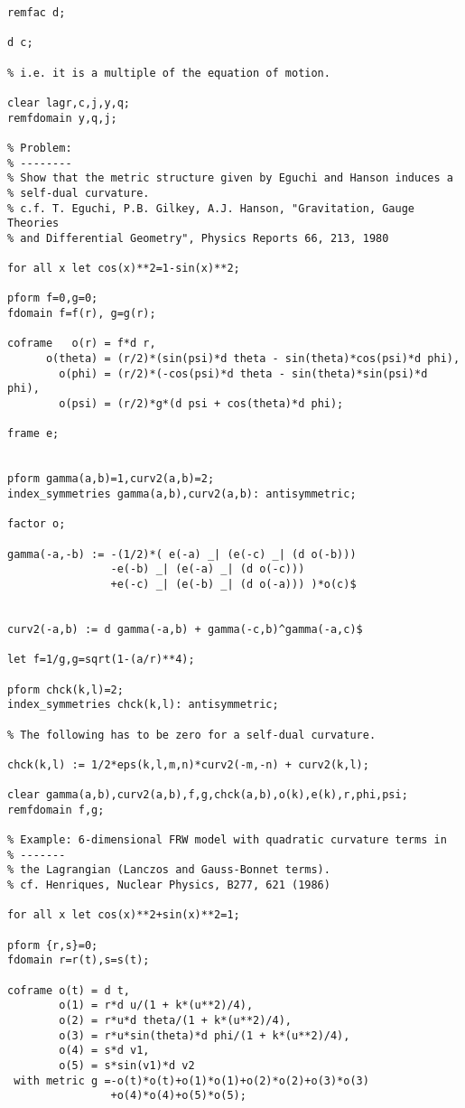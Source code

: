 {\begin{verbatim}
remfac d;

d c;

% i.e. it is a multiple of the equation of motion.

clear lagr,c,j,y,q;
remfdomain y,q,j;

% Problem:
% --------
% Show that the metric structure given by Eguchi and Hanson induces a
% self-dual curvature.
% c.f. T. Eguchi, P.B. Gilkey, A.J. Hanson, "Gravitation, Gauge Theories
% and Differential Geometry", Physics Reports 66, 213, 1980

for all x let cos(x)**2=1-sin(x)**2;

pform f=0,g=0;
fdomain f=f(r), g=g(r);

coframe   o(r) = f*d r,
      o(theta) = (r/2)*(sin(psi)*d theta - sin(theta)*cos(psi)*d phi),
        o(phi) = (r/2)*(-cos(psi)*d theta - sin(theta)*sin(psi)*d phi),
        o(psi) = (r/2)*g*(d psi + cos(theta)*d phi);

frame e;


pform gamma(a,b)=1,curv2(a,b)=2;
index_symmetries gamma(a,b),curv2(a,b): antisymmetric;

factor o;

gamma(-a,-b) := -(1/2)*( e(-a) _| (e(-c) _| (d o(-b)))
		        -e(-b) _| (e(-a) _| (d o(-c)))
		        +e(-c) _| (e(-b) _| (d o(-a))) )*o(c)$


curv2(-a,b) := d gamma(-a,b) + gamma(-c,b)^gamma(-a,c)$

let f=1/g,g=sqrt(1-(a/r)**4);

pform chck(k,l)=2;
index_symmetries chck(k,l): antisymmetric;

% The following has to be zero for a self-dual curvature.

chck(k,l) := 1/2*eps(k,l,m,n)*curv2(-m,-n) + curv2(k,l);

clear gamma(a,b),curv2(a,b),f,g,chck(a,b),o(k),e(k),r,phi,psi;
remfdomain f,g;

% Example: 6-dimensional FRW model with quadratic curvature terms in
% -------
% the Lagrangian (Lanczos and Gauss-Bonnet terms).
% cf. Henriques, Nuclear Physics, B277, 621 (1986)

for all x let cos(x)**2+sin(x)**2=1;

pform {r,s}=0;
fdomain r=r(t),s=s(t);

coframe o(t) = d t,
        o(1) = r*d u/(1 + k*(u**2)/4),
        o(2) = r*u*d theta/(1 + k*(u**2)/4),
        o(3) = r*u*sin(theta)*d phi/(1 + k*(u**2)/4),
        o(4) = s*d v1,
        o(5) = s*sin(v1)*d v2
 with metric g =-o(t)*o(t)+o(1)*o(1)+o(2)*o(2)+o(3)*o(3)
                +o(4)*o(4)+o(5)*o(5);


\end{verbatim}}
